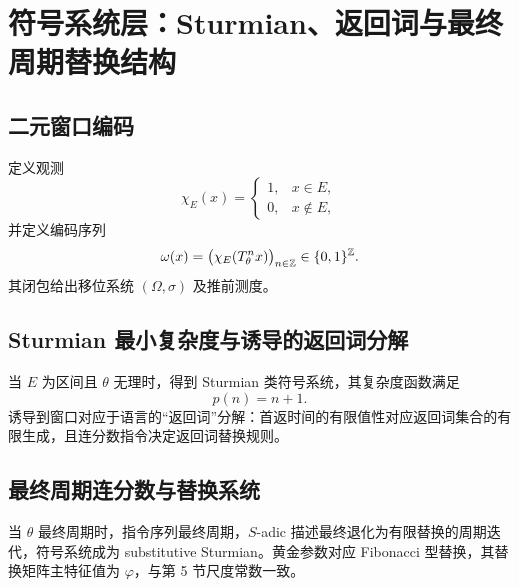 \section{符号系统层：Sturmian、返回词与最终周期替换结构}

\subsection{二元窗口编码}

定义观测
\[
\chi_E(x)=
\begin{cases}
1,&x\in E,\\
0,&x\notin E,
\end{cases}
\]
并定义编码序列
\[
\omega(x)=\bigl(\chi_E(T_\theta^n x)\bigr)_{n\in\mathbb{Z}}\in\{0,1\}^{\mathbb{Z}}.
\]
其闭包给出移位系统 $(\Omega,\sigma)$ 及推前测度。

\subsection{Sturmian 最小复杂度与诱导的返回词分解}

当 $E$ 为区间且 $\theta$ 无理时，得到 Sturmian 类符号系统，其复杂度函数满足
\[
p(n)=n+1.
\]
诱导到窗口对应于语言的“返回词”分解：首返时间的有限值性对应返回词集合的有限生成，且连分数指令决定返回词替换规则。

\subsection{最终周期连分数与替换系统}

当 $\theta$ 最终周期时，指令序列最终周期，$S$-adic 描述最终退化为有限替换的周期迭代，符号系统成为 substitutive Sturmian。黄金参数对应 Fibonacci 型替换，其替换矩阵主特征值为 $\varphi$，与第 5 节尺度常数一致。

